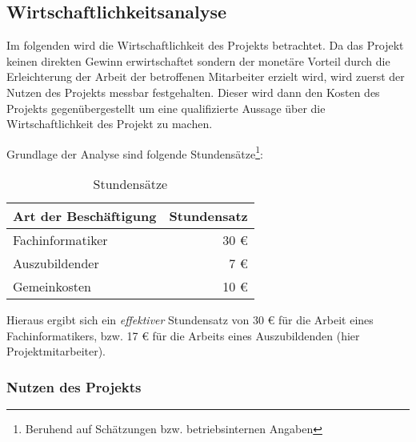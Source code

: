 \documentclass[12pt, xcolor=dvipsnames]{scrartcl}
\begin{document}
\subsection{Wirtschaftlichkeitsanalyse}
\label{sec:wirtschaftlichkeitsanalyse}

Im folgenden wird die Wirtschaftlichkeit des Projekts betrachtet. Da das Projekt keinen direkten Gewinn erwirtschaftet sondern der monetäre Vorteil durch die Erleichterung der Arbeit der betroffenen Mitarbeiter erzielt wird, wird zuerst der Nutzen des Projekts messbar festgehalten. Dieser wird dann den Kosten des Projekts gegenübergestellt um eine qualifizierte Aussage über die Wirtschaftlichkeit des Projekt zu machen.

Grundlage der Analyse sind folgende Stundensätze\footnote{Beruhend auf Schätzungen bzw. betriebsinternen Angaben}:

\begin{table}[H]
	\centering
	\begin{tabular}{lr}

		\rowcolor{white!15}				
		\textbf{Art der Beschäftigung} & \textbf{Stundensatz} \\\hline		
		
		Fachinformatiker & 30 \euro \\
		Auszubildender & 7 \euro \\
		Gemeinkosten & 10 \euro \\
			    
	\end{tabular}
	\caption{Stundensätze}
	\label{tab:stundensätze}
\end{table}

Hieraus ergibt sich ein \textit{effektiver} Stundensatz von 30 \euro{} für die Arbeit eines Fachinformatikers, bzw. 17 \euro{} für die Arbeits eines Auszubildenden (hier Projektmitarbeiter).


\subsubsection{Nutzen des Projekts}
\label{sec:nutzen_des_projekts}
\end{document}
